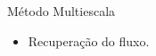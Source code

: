 \documentclass[professionalfont]{beamer}
\begin{document}
    




\begin{frame}{Método Multiescala}
    \begin{itemize}
        \item Recuperação do fluxo.
    \end{itemize}
    
\end{frame}

    
\end{document}
